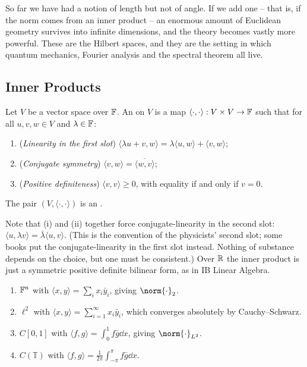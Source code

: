 \documentclass[a4paper]{scrartcl}
\newcommand{\ip}[2]{\langle #1, #2 \rangle}
\begin{document}
So far we have had a notion of length but not of angle. If we add one -- that is, if the norm comes from an inner product -- an enormous amount of Euclidean geometry survives into infinite dimensions, and the theory becomes vastly more powerful. These are the Hilbert spaces, and they are the setting in which quantum mechanics, Fourier analysis and the spectral theorem all live.

\subsection{Inner Products}

\begin{definition}
	Let $V$ be a vector space over $\mathbb{F}$. An  on $V$ is a map $\ip{\cdot}{\cdot} : V \times V \to \F$ such that for all $u,v,w \in V$ and $\lambda \in \mathbb{F}$:
	\begin{enumerate}[label=(\roman*)]
		\item (\emph{Linearity in the first slot}) $\ip{\lambda u + v}{w} = \lambda \ip{u}{w} + \ip{v}{w}$;
		\item (\emph{Conjugate symmetry}) $\ip{v}{w} = \overline{\ip{w}{v}}$;
		\item (\emph{Positive definiteness}) $\ip{v}{v} \geq 0$, with equality if and only if $v = 0$.
	\end{enumerate}
	The pair $(V, \ip{\cdot}{\cdot})$ is an .
\end{definition}

Note that (i) and (ii) together force conjugate-linearity in the second slot: $\ip{u}{\lambda v} = \bar\lambda \ip{u}{v}$. (This is the convention of the physicists' second slot; some books put the conjugate-linearity in the first slot instead. Nothing of substance depends on the choice, but one must be consistent.) Over $\mathbb{R}$ the inner product is just a symmetric positive definite bilinear form, as in IB Linear Algebra.

\begin{example}
	\begin{enumerate}[label=(\roman*)]
		\item $\mathbb{F}^n$ with $\ip{x}{y} = \sum_i x_i \bar y_i$, giving $\norm{\cdot}_2$.
		\item $\ell^2$ with $\ip{x}{y} = \sum_{i=1}^\infty x_i \bar y_i$, which converges absolutely by Cauchy--Schwarz.
		\item $C[0,1]$ with $\ip{f}{g} = \int_0^1 f \bar g \dd x$, giving $\norm{\cdot}_{L^2}$.
		\item $C(\mathbb{T})$ with $\ip{f}{g} = \frac{1}{2\pi}\int_{-\pi}^\pi f\bar g \dd x$.
	\end{enumerate}
\end{example}
\end{document}
